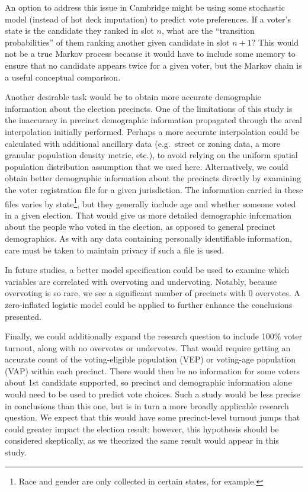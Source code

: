 \documentclass[12pt,twoside]{reedthesis}
\begin{document}
An option to address this issue in Cambridge might be using some stochastic model (instead of hot deck imputation) to predict vote preferences. If a voter's state is the candidate they ranked in slot \(n\), what are the ``transition probabilities'' of them ranking another given candidate in slot \(n + 1\)? This would not be a true Markov process because it would have to include some memory to ensure that no candidate appears twice for a given voter, but the Markov chain is a useful conceptual comparison.

Another desirable task would be to obtain more accurate demographic information about the election precincts. One of the limitations of this study is the inaccuracy in precinct demographic information propagated through the areal interpolation initially performed. Perhaps a more accurate interpolation could be calculated with additional ancillary data (e.g.~street or zoning data, a more granular population density metric, etc.), to avoid relying on the uniform spatial population distribution assumption that we used here. Alternatively, we could obtain better demographic information about the precincts directly by examining the voter registration file for a given jurisdiction. The information carried in these files varies by state\footnote{Race and gender are only collected in certain states, for example.}, but they generally include age and whether someone voted in a given election. That would give us more detailed demographic information about the people who voted in the election, as opposed to general precinct demographics. As with any data containing personally identifiable information, care must be taken to maintain privacy if such a file is used.

In future studies, a better model specification could be used to examine which variables are correlated with overvoting and undervoting. Notably, because overvoting is so rare, we see a significant number of precincts with 0 overvotes. A zero-inflated logistic model could be applied to further enhance the conclusions presented.

Finally, we could additionally expand the research question to include 100\% voter turnout, along with no overvotes or undervotes. That would require getting an accurate count of the voting-eligible population (VEP) or voting-age population (VAP) within each precinct. There would then be no information for some voters about 1st candidate supported, so precinct and demographic information alone would need to be used to predict vote choices. Such a study would be less precise in conclusions than this one, but is in turn a more broadly applicable research question. We expect that this would have some precinct-level turnout jumps that could greater impact the election result; however, this hypothesis should be considered skeptically, as we theorized the same result would appear in this study.
\end{document}
